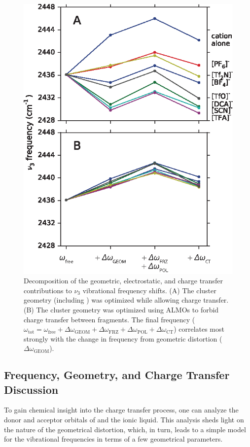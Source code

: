 \begin{figure}
	\includegraphics[scale=1]{./anions/fig4.eps}
	\caption[ALMO decomposition of carbon dioxide frequency]{\label{fig:decomposition}Decomposition of the geometric, electrostatic, and charge transfer contributions to  $\nu_3$ vibrational frequency shifts. (A) The cluster geometry (including ) was optimized while allowing charge transfer. (B) The cluster geometry was optimized using ALMOs to forbid charge transfer between fragments. The final frequency ($\omega_\mathrm{tot} = \omega_\mathrm{free} + \Delta \omega_\mathrm{GEOM} + \Delta \omega_\mathrm{FRZ} + \Delta \omega_\mathrm{POL} + \Delta \omega_\mathrm{CT}$) correlates most strongly with the change in frequency from geometric distortion ($\Delta \omega_\mathrm{GEOM}$).}
\end{figure}

\subsection{Frequency, Geometry, and  Charge Transfer Discussion}
\label{sec:freq-geom_disc}
To gain chemical insight into the charge transfer process, one can analyze the donor and acceptor orbitals of  and the ionic liquid. This analysis sheds light on the nature of the geometrical distortion, which, in turn, leads to a simple model for the vibrational frequencies in terms of a few geometrical parameters.

